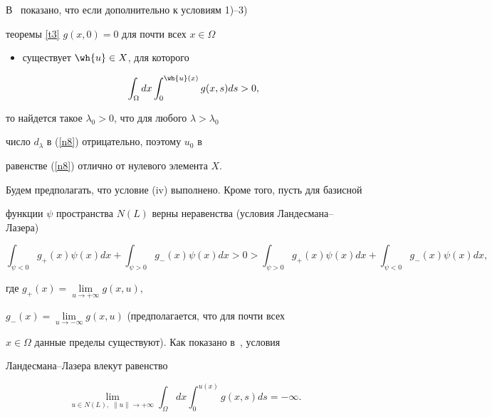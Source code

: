 В~\cite{pot1} показано, что если дополнительно к условиям 1)--3)


теоремы \ref{t3} $g(x, 0)=0$ для почти всех $x\in\Omega$ 


\begin{itemize}


\item[(iv)] существует $\wh{u} \in X$, для которого


$$


\int_{\Omega}dx\int_0^{\wh{u}(x)}g(x, s)ds>0,


$$


\end{itemize}


то найдется такое $\lambda_0>0$, что для любого $\lambda>\lambda_0$


число $d_{\lambda}$ в (\ref{n8}) отрицательно, поэтому $u_0$ в


равенстве (\ref{n8}) отлично от нулевого элемента $X$.





Будем предполагать, что условие (iv) выполнено. Кроме того, пусть для базисной


функции $\psi$ пространства $N(L)$ верны неравенства (условия Ландесмана--Лазера)


\begin{equation}


\int_{\psi<0}g_+(x)\psi(x)dx+\int_{\psi>0}g_-(x)\psi(x)dx>0>


\label{n9}


\int_{\psi>0}g_+(x)\psi(x)dx+\int_{\psi<0}g_-(x)\psi(x)dx,


\end{equation}


где $g_+(x)=\lim\limits_{u\to +\infty}g(x, u)$,


$g_-(x)=\lim\limits_{u\to -\infty}g(x, u)$ (предполагается, что для почти всех


$x\in\Omega$ данные пределы существуют). Как показано в~\cite{vadim}, условия


Ландесмана--Лазера влекут равенство


\begin{equation}


\label{n10}


\lim\limits_{u\in N(L),\; \|u\|\to +\infty}


\int_{\Omega}dx\int_0^{u(x)}g(x, s)ds=-\infty.


\end{equation}





